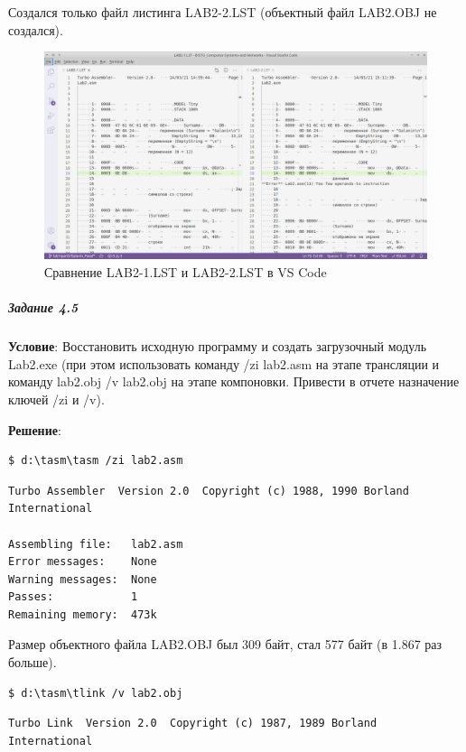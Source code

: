 Создался только файл листинга LAB2-2.LST (объектный файл LAB2.OBJ не создался).

\begin{figure}[h]
    \centering
    \includegraphics[width=18cm]{../_INCLUDES/lst1-and-lst2.png}
    \caption{Сравнение LAB2-1.LST и LAB2-2.LST в VS Code}
\end{figure}



\subparagraph{Задание 4.5}

\textbf{Условие}:
Восстановить исходную программу и создать загрузочный модуль Lab2.exe (при этом использовать команду  /zi lab2.asm на этапе трансляции и команду lab2.obj  /v lab2.obj на этапе компоновки. Привести в отчете назначение ключей /zi и /v).

\textbf{Решение}:

\begin{lstlisting}[language=Terminal]
$ d:\tasm\tasm /zi lab2.asm
\end{lstlisting}

\begin{lstlisting}[language=Out]
Turbo Assembler  Version 2.0  Copyright (c) 1988, 1990 Borland International

Assembling file:   lab2.asm
Error messages:    None
Warning messages:  None
Passes:            1
Remaining memory:  473k
\end{lstlisting}

Размер объектного файла LAB2.OBJ был 309 байт, стал 577 байт (в 1.867 раз больше).

\begin{lstlisting}[language=Terminal]
$ d:\tasm\tlink /v lab2.obj
\end{lstlisting}

\begin{lstlisting}[language=Out]
Turbo Link  Version 2.0  Copyright (c) 1987, 1989 Borland International
\end{lstlisting}

